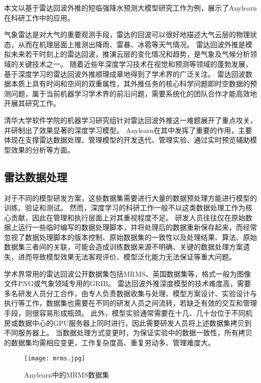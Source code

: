 本文以基于雷达回波外推的短临强降水预测大模型研究工作为例，展示了Anylearn在科研工作中的应用。

气象雷达是对大气的重要观测手段，雷达的回波可以很好地描述大气云层的物理状态，从而在机理层面上推测出降雨、雷暴、冰雹等天气情况。
雷达回波外推是模拟未来若干时刻上的雷达回波，推演云层的变化情况和趋势，是气象及气候分析领域的关键技术之一。
随着近些年深度学习技术在视觉和预测等领域的蓬勃发展，基于深度学习的雷达回波外推顺理成章地得到了学术界的广泛关注\cite{Zha23}。
雷达回波数据本质上具有时间和空间的双重属性，其外推任务的核心科学问题即时空数据的预测问题，属于当前机器学习学术界的前沿问题，需要系统化的团队合作才能高效地开展其研究工作。

清华大学软件学院的机器学习研究组针对雷达回波外推这一难题展开了重点攻关，并研制出了效果显著的深度学习模型。
Anylearn在其中发挥了重要的作用，主要体现在支撑雷达数据处理、管理模型的开发迭代、管理实验、通过实时预览辅助模型效果的分析等方面。

\subsection{雷达数据处理}
对于不同的模型研发方案，这些数据集需要进行大量的数据预处理方能进行模型的训练、验证和测试。
然而，深度学习的科研工作一般不以这类数据处理工作为核心贡献，因此在管理和执行层面上对其重视程度不足。
研发人员往往仅在原始数据上运行一些临时编写的数据处理脚本，并将处理后的数据重新保存起来，而经常忽视了数据处理脚本的版本控制、原始数据集的一致性以及处理结果、算法、原始数据集三者间的关联，可能会造成训练数据来源不明确、关键的数据处理方案遗失，进而导致模型效果无法客观评价、模型泛化能力无法保证等重大问题。

学术界常用的雷达回波公开数据集包括MRMS\cite{Smi16}、英国数据集\cite{Rav21}等，格式一般为图像文件PNG或气象领域专用的GRIB。
雷达回波外推深度模型的技术难度高，需要多名研发人员分工合作，由专人负责数据收集与处理、模型方案设计、实验设计与执行等工作，数据集也需要在不同的研发人员之间流转，若缺乏有效的交互和管理手段，则很容易形成瓶颈。
此外，模型实验通常需要在十几、几十台位于不同机房或数据中心的GPU服务器上同时进行，因此需要研发人员将上述数据集拷贝到不同服务器上。
当数据处理方式变更时，为保证实验中的数据一致性，所有拷贝的数据集均需相应变更，工作复杂度高、重复劳动多、管理难度大。

\begin{figure}
  \centering
  \texttt{[image: mrms.jpg]}
  \caption{Anylearn中的MRMS数据集}
  \label{fig:mrms}
\end{figure}

